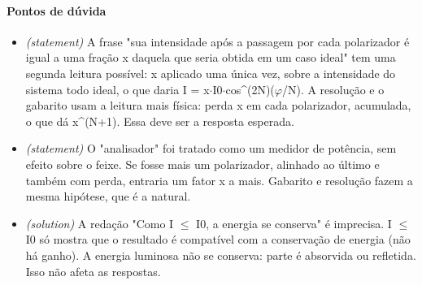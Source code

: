 \documentclass{article}%
\begin{document}
\paragraph{Pontos de dúvida}%
\begin{itemize}%
\item%
\textit{(statement)} A frase "sua intensidade após a passagem por cada polarizador é igual a uma fração x daquela que seria obtida em um caso ideal" tem uma segunda leitura possível: x aplicado uma única vez, sobre a intensidade do sistema todo ideal, o que daria I = x$\cdot$I0$\cdot$cos\^{}(2N)($\varphi$/N). A resolução e o gabarito usam a leitura mais física: perda x em cada polarizador, acumulada, o que dá x\^{}(N+1). Essa deve ser a resposta esperada.%
\item%
\textit{(statement)} O "analisador" foi tratado como um medidor de potência, sem efeito sobre o feixe. Se fosse mais um polarizador, alinhado ao último e também com perda, entraria um fator x a mais. Gabarito e resolução fazem a mesma hipótese, que é a natural.%
\item%
\textit{(solution)} A redação "Como I $\leq$ I0, a energia se conserva" é imprecisa. I $\leq$ I0 só mostra que o resultado é compatível com a conservação de energia (não há ganho). A energia luminosa não se conserva: parte é absorvida ou refletida. Isso não afeta as respostas.%
\end{itemize}%
\end{document}
